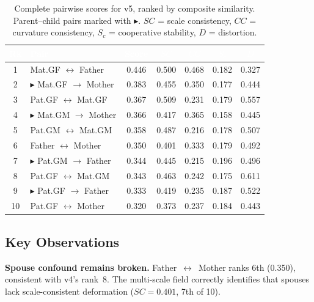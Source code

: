 \documentclass{../yalumba}
\begin{document}
\begin{table}[H]
  \centering
  \tablestyle
  \caption{Complete pairwise scores for v5, ranked by composite similarity.
    Parent--child pairs marked with $\blacktriangleright$.  $SC$ = scale
    consistency, $CC$ = curvature consistency, $S_c$ = cooperative stability,
    $D$ = distortion.}
  \label{tab:scores}
  \begin{tabular}{clccccc}
    \toprule
    \rowcolor{table-header}
    \textcolor{white}{\textbf{Rk}} &
    \textcolor{white}{\textbf{Pair}} &
    \textcolor{white}{\textbf{Score}} &
    \textcolor{white}{\textbf{$SC$}} &
    \textcolor{white}{\textbf{$CC$}} &
    \textcolor{white}{\textbf{$S_c$}} &
    \textcolor{white}{\textbf{$D$}} \\
    \midrule
    1 & Mat.GF $\leftrightarrow$ Father
      & 0.446 & 0.500 & 0.468 & 0.182 & 0.327 \\
    2 & $\blacktriangleright$ Mat.GF $\to$ Mother
      & 0.383 & 0.455 & 0.350 & 0.177 & 0.444 \\
    3 & Pat.GF $\leftrightarrow$ Mat.GF
      & 0.367 & 0.509 & 0.231 & 0.179 & 0.557 \\
    4 & $\blacktriangleright$ Mat.GM $\to$ Mother
      & 0.366 & 0.417 & 0.365 & 0.158 & 0.445 \\
    5 & Pat.GM $\leftrightarrow$ Mat.GM
      & 0.358 & 0.487 & 0.216 & 0.178 & 0.507 \\
    6 & Father $\leftrightarrow$ Mother
      & 0.350 & 0.401 & 0.333 & 0.179 & 0.492 \\
    7 & $\blacktriangleright$ Pat.GM $\to$ Father
      & 0.344 & 0.445 & 0.215 & 0.196 & 0.496 \\
    8 & Pat.GF $\leftrightarrow$ Mat.GM
      & 0.343 & 0.463 & 0.242 & 0.175 & 0.611 \\
    9 & $\blacktriangleright$ Pat.GF $\to$ Father
      & 0.333 & 0.419 & 0.235 & 0.187 & 0.522 \\
    10 & Pat.GF $\leftrightarrow$ Mother
      & 0.320 & 0.373 & 0.237 & 0.184 & 0.443 \\
    \bottomrule
  \end{tabular}
\end{table}

\subsection{Key Observations}

\begin{keyfinding}
\textbf{Spouse confound remains broken.}  Father~$\leftrightarrow$~Mother
ranks 6th (0.350), consistent with v4's rank~8.  The multi-scale field
correctly identifies that spouses lack scale-consistent deformation
($SC = 0.401$, 7th of 10).
\end{keyfinding}
\end{document}
